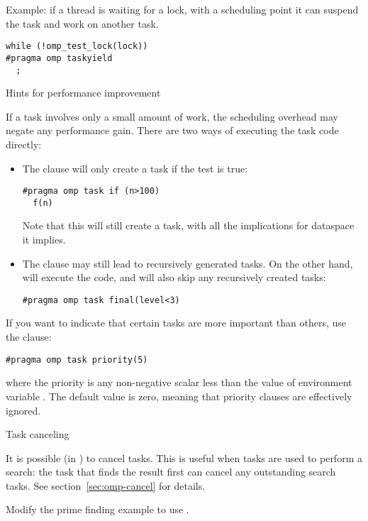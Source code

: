 Example: if a thread is waiting for a lock, with a scheduling point it
can suspend the task and work on another task.
\begin{lstlisting}[language=omp]
while (!omp_test_lock(lock))
#pragma omp taskyield
  ;
\end{lstlisting}

 {Hints for performance improvement}
\label{sec:omp-task-hint}

If a task involves only a small amount of work,
the scheduling overhead may negate any performance gain.
There are two ways of executing the task code directly:
\begin{itemize}
\item The  clause will only create a task
  if the test is true:
\begin{lstlisting}[language=omp]
#pragma omp task if (n>100)
  f(n)
\end{lstlisting}
Note that this will still create a task, with
all the implications for dataspace it implies.
\item The  clause may still lead to recursively
  generated tasks. On the other hand, 
  will execute the code, and will also skip any recursively created tasks:
\begin{lstlisting}[language=omp]
#pragma omp task final(level<3)
\end{lstlisting}
\end{itemize}

If you want to indicate that certain tasks are more important
than others, use the  clause:
\begin{lstlisting}[language=omp]
#pragma omp task priority(5)
\end{lstlisting}
where the priority is any non-negative scalar
less than the value of environment variable .
The default value is zero, meaning that priority clauses are effectively ignored.

 {Task canceling}

It is possible (in ) to cancel
tasks. This is useful when tasks are used to perform a search: the
task that finds the result first can cancel any outstanding search
tasks.
See section~\ref{sec:omp-cancel} for details.

\begin{exercise}
  Modify the prime finding example to use .
\end{exercise}

